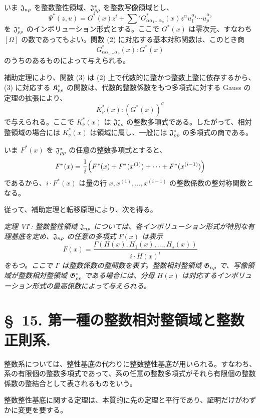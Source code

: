 \documentclass[11pt]{jlreq}
\begin{document}
いま $\mathfrak{J}_{n\rho}$ を整数整性領域、$\mathfrak{J}^*_{\rho\rho}$ を整数写像領域とし、
\[
  \Psi^*(z,u)=G^*(x)z^i+
  \sum{}'G^*_{\alpha\alpha_1\ldots\alpha_\rho}(x)
  z^\alpha u_1^{\alpha_1}\cdots u_\rho^{\alpha_\rho}
\]
を $\mathfrak{J}^*_{\rho\rho}$ のインボリューション形式とする。ここで $G^*(x)$ は零次元、すなわち $[\Omega]$ の数であってもよい。関数 (2) に対応する基本対称関数は、このとき商
\begin{equation}
  G^*_{\alpha\alpha_1\ldots\alpha_\rho}(x):G^*(x)
\tag{4}
\end{equation}
のうちのあるものによって与えられる。

補助定理により、関数 (3) は (2) 上で代数的に整かつ整数上整に依存するから、(3) に対応する $\mathfrak{K}^*_{\rho\rho}$ の関数は、代数的整数係数をもつ多項式に対する Gauss の定理の拡張により、
\begin{equation}
  K_\nu^*(x):(G^*(x))^\sigma
\tag{5}
\end{equation}
で与えられる。ここで $K_\nu^*(x)$ は $\mathfrak{J}^*_{\rho\rho}$ の整数多項式である。したがって、相対整領域の場合には $K_\nu^*(x)$ は領域に属し、一般には $\mathfrak{J}^*_{\rho\rho}$ の多項式の商である。

いま $F^*(x)$ を $\mathfrak{J}^*_{\rho\rho}$ の任意の整数多項式とすると、
\[
  F^*(x)=\frac1i\Bigl(F^*(x)+F^*(x^{(1)})+\cdots+F^*(x^{(i-1)})\Bigr)
\]
であるから、$i\cdot F^*(x)$ は量の行 $x,x^{(1)},\ldots,x^{(i-1)}$ の整数係数の整対称関数となる。

従って、補助定理と転移原理により、次を得る。

\emph{定理 VI$'$: 整数整性領域 $\mathfrak{J}_{n\rho}$ については、各インボリューション形式が特別な有理基底を定め、$\mathfrak{J}_{n\rho}$ の任意の多項式 $F(x)$ は表示}
\[
  F(x)=\frac{\Gamma(H(x),H_1(x),\ldots,H_s(x))}{i\cdot H(x)^i}
\]
\emph{をもつ。ここで $\Gamma$ は整数係数の整関数を表す。整数相対整領域 $\mathfrak{G}_{n\rho}$ で、写像領域が整数相対整領域 $\mathfrak{G}^*_{\rho\rho}$ である場合には、分母 $H(x)$ は対応するインボリューション形式の最高係数によって与えられる。}

\section*{\S\ 15. 第一種の整数相対整領域と整数正則系.}

整数系については、整性基底の代わりに整数整性基底が用いられる。すなわち、系の有限個の整数多項式であって、系の任意の整数多項式がそれら有限個の整数係数の整結合として表されるものをいう。

整数整性基底に関する定理は、本質的に先の定理と平行であり、証明だけがわずかに変更を要する。
\end{document}
